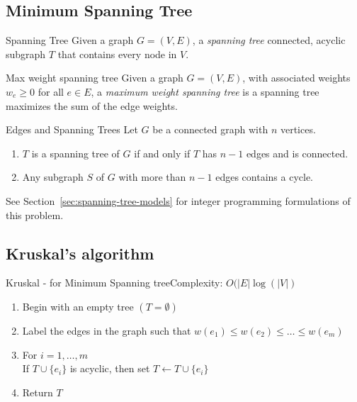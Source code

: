 \subsection{Minimum Spanning Tree}
\begin{definition}{Spanning Tree}{}
Given a graph $G = (V,E)$, a \emph{spanning tree} connected, acyclic subgraph $T$ that contains every node in $V$.
\end{definition}


\begin{definition}{Max weight spanning tree}{}
Given a graph $G = (V,E)$, with associated weights $w_e\geq 0$ for all $e \in E$, a \emph{maximum weight spanning tree} is a spanning tree maximizes the sum of the edge weights.
\end{definition}




\begin{lemma}{Edges and Spanning Trees}{}
Let  $G$ be a  connected graph with $n$ vertices.  
\begin{enumerate}
\item $T$ is a spanning tree of $G$ if and only if $T$ has $n-1$ edges and is connected.
\item Any subgraph $S$ of $G$ with more than $n-1$ edges contains a cycle.
\end{enumerate}
\end{lemma}


See Section~\ref{sec:spanning-tree-models} for integer programming formulations of this problem.  
\subsection{Kruskal's algorithm}
\begin{general}{Kruskal  - for Minimum Spanning tree}{Complexity: $O(|E| \log(|V|)$}
\label{alg:Kruskal}
\begin{enumerate}
\item Begin with an empty tree $(T = \emptyset)$
\item Label the edges in the graph such that $w(e_1) \leq w(e_2) \leq \dots \leq w(e_m)$
\item For $i=1, \dots, m$\\
\indent  If $T \cup\{e_i\}$ is acyclic, then set $T \leftarrow T \cup \{e_i\}$
\item Return $T$
\end{enumerate}
\end{general}


